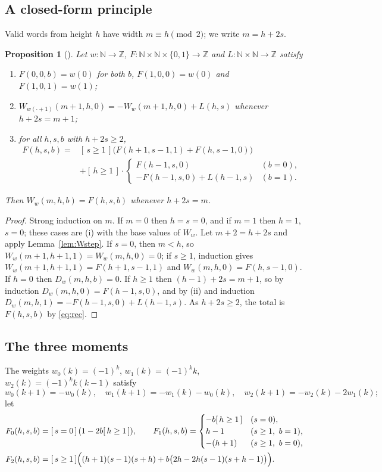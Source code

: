 \documentclass[11pt]{amsart}
\theoremstyle{plain}
\newtheorem{proposition}[theorem]{Proposition}
\theoremstyle{definition}
\newcommand{\N}{\mathbb{N}}
\newcommand{\Z}{\mathbb{Z}}
\newcommand{\ib}[1]{[\,#1\,]}
\begin{document}
\subsection{A closed-form principle}
Valid words from height $h$ have width $m\equiv h\pmod 2$; we write $m=h+2s$.

\begin{proposition}[]\label{prop:gen}
Let $w\colon\N\to\Z$, $F\colon\N\times\N\times\{0,1\}\to\Z$ and $L\colon\N\times\N\to\Z$ satisfy
\begin{enumerate}
\item[(i)] $F(0,0,b)=w(0)$ for both $b$, $F(1,0,0)=w(0)$ and $F(1,0,1)=w(1)$;
\item[(ii)] $W_{w(\cdot+1)}(m+1,h,0)=-W_w(m+1,h,0)+L(h,s)$ whenever $h+2s=m+1$;
\item[(iii)] for all $h,s,b$ with $h+2s\ge2$,
\begin{equation}\label{eq:rec}
\begin{aligned}F(h,s,b)={}&\ib{s\ge1}\bigl(F(h+1,s-1,1)+F(h,s-1,0)\bigr)\\
&+\ib{h\ge1}\cdot\begin{cases}F(h-1,s,0)&(b=0),\\ -F(h-1,s,0)+L(h-1,s)&(b=1).\end{cases}\end{aligned}
\end{equation}
\end{enumerate}
Then $W_w(m,h,b)=F(h,s,b)$ whenever $h+2s=m$.
\end{proposition}

\begin{proof}
Strong induction on $m$. If $m=0$ then $h=s=0$, and if $m=1$ then $h=1$, $s=0$; these cases are (i) with the base values of $W_w$. Let $m+2=h+2s$ and apply Lemma~\ref{lem:Wstep}. If $s=0$, then $m<h$, so $W_w(m+1,h+1,1)=W_w(m,h,0)=0$; if $s\ge1$, induction gives $W_w(m+1,h+1,1)=F(h+1,s-1,1)$ and $W_w(m,h,0)=F(h,s-1,0)$. If $h=0$ then $D_w(m,h,b)=0$. If $h\ge1$ then $(h-1)+2s=m+1$, so by induction $D_w(m,h,0)=F(h-1,s,0)$, and by (ii) and induction $D_w(m,h,1)=-F(h-1,s,0)+L(h-1,s)$. As $h+2s\ge2$, the total is $F(h,s,b)$ by \eqref{eq:rec}.
\end{proof}

\subsection{The three moments}
The weights $w_0(k)=(-1)^k$, $w_1(k)=(-1)^kk$, $w_2(k)=(-1)^kk(k-1)$ satisfy
\begin{equation}\label{eq:shift}
  w_0(k+1)=-w_0(k),\quad w_1(k+1)=-w_1(k)-w_0(k),\quad w_2(k+1)=-w_2(k)-2w_1(k);
\end{equation}
let
\begin{align*}
F_0(h,s,b)&=\ib{s=0}\,(1-2b\ib{h\ge1}),\qquad
F_1(h,s,b)=\begin{cases}-b\ib{h\ge1}&(s=0),\\ h-1&(s\ge1,\ b=1),\\ -(h+1)&(s\ge1,\ b=0),\end{cases}\\
F_2(h,s,b)&=\ib{s\ge1}\Bigl((h+1)(s-1)(s+h)+b\bigl(2h-2h(s-1)(s+h-1)\bigr)\Bigr).
\end{align*}
\end{document}
